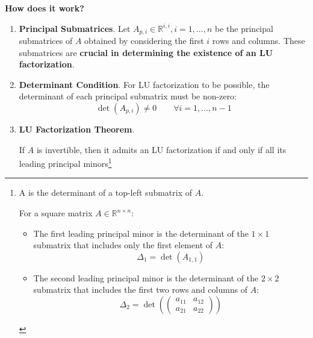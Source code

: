 \highspace
\begin{flushleft}
    \textcolor{Green3}{ \textbf{How does it work?}}
\end{flushleft}
\begin{enumerate}
    \item \textcolor{Green3}{\textbf{Principal Submatrices}}. Let $A_{p,i} \in \mathbb{R}^{i,i}, i = 1, \dots, n$ be the principal submatrices of $A$ obtained by considering the first $i$ rows and columns. These submatrices are \textbf{crucial in determining the existence of an LU factorization}.

    \item \textcolor{Green3}{\textbf{Determinant Condition}}. For LU factorization to be possible, the determinant of each principal submatrix must be non-zero:
    \begin{equation*}
        \det(A_{p,i}) \neq 0 \hspace{2em} \forall i = 1, \ldots, n-1
    \end{equation*}

    \item \textcolor{Green3}{\textbf{LU Factorization Theorem}}. \begin{theorem}
        If $A$ is invertible, then it admits an LU factorization if and only if all its leading principal minors\footnote{%
            A  is the determinant of a top-left submatrix of $A$.
            
            For a square matrix $A \in \mathbb{R}^{n \times n}$:
            \begin{itemize}
                \item The first leading principal minor is the determinant of the $1 \times 1$ submatrix that includes only the first element of $A$:
                \begin{equation*}
                    \Delta_1 = \det(A_{1,1})
                \end{equation*}

                \item The second leading principal minor is the determinant of the $2 \times 2$ submatrix that includes the first two rows and columns of $A$:
                \begin{equation*}
                    \Delta_2 = \det\left(\begin{pmatrix}
                        a_{11} & a_{12} \\
                        a_{21} & a_{22}
                    \end{pmatrix}\right)
                \end{equation*}


\end{itemize}}
\end{theorem}
\end{enumerate}
